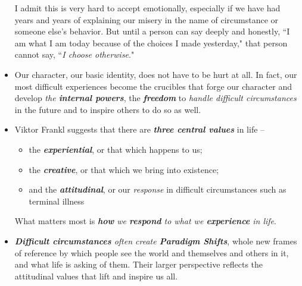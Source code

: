 \documentclass[11pt]{article}
\begin{document}
\begin{itemize}
I admit this is very hard to accept emotionally, especially if we have had years and years of
explaining our misery in the name of circumstance or someone else's behavior. But until a person can
say deeply and honestly, ``I am what I am today because of the choices I made yesterday," that person
cannot say, ``\emph{I choose otherwise}."

\item Our character, our basic identity, does not have to be hurt at all. In fact, our most difficult experiences become the crucibles that forge our character and develop \emph{the \textbf{internal powers}}, the \emph{\textbf{freedom}} to \emph{handle difficult circumstances} in the future and to inspire others to do so as well.

\item Viktor Frankl suggests that there are \emph{\textbf{three central values}} in life -- 
\begin{itemize}
\item the \textbf{\emph{experiential}}, or that which happens to us; 
\item the \textbf{\emph{creative}}, or that which we bring into existence; 
\item and the \textbf{\emph{attitudinal}}, or our \emph{response} in difficult circumstances such as terminal illness
\end{itemize}
What matters most is \emph{\textbf{how} we \textbf{respond} to what we \textbf{experience} in life}.

\item \emph{\textbf{Difficult circumstances} often create \textbf{Paradigm Shifts}}, whole new frames of reference by which people see the world and themselves and others in it, and what life is asking of them. Their larger perspective reflects the attitudinal values that lift and inspire us all.
\end{itemize}
\end{document}
